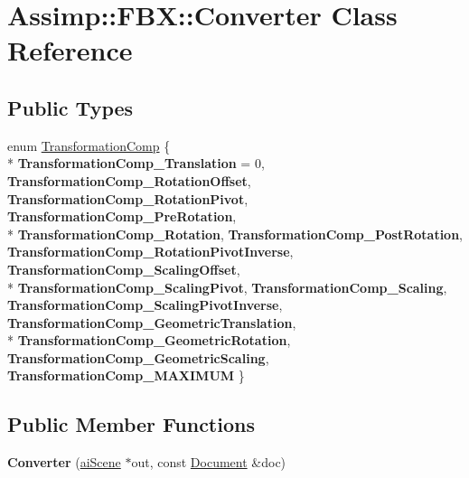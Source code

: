 \hypertarget{class_assimp_1_1_f_b_x_1_1_converter}{\section{Assimp\+:\+:F\+B\+X\+:\+:Converter Class Reference}
\label{class_assimp_1_1_f_b_x_1_1_converter}
}
\subsection*{Public Types}
\begin{DoxyCompactItemize}
\item 
enum \hyperlink{class_assimp_1_1_f_b_x_1_1_converter_a82779d0cf6d795b699e12232fe9ed15e}{Transformation\+Comp} \{ \\*
{\bfseries Transformation\+Comp\+\_\+\+Translation} = 0, 
{\bfseries Transformation\+Comp\+\_\+\+Rotation\+Offset}, 
{\bfseries Transformation\+Comp\+\_\+\+Rotation\+Pivot}, 
{\bfseries Transformation\+Comp\+\_\+\+Pre\+Rotation}, 
\\*
{\bfseries Transformation\+Comp\+\_\+\+Rotation}, 
{\bfseries Transformation\+Comp\+\_\+\+Post\+Rotation}, 
{\bfseries Transformation\+Comp\+\_\+\+Rotation\+Pivot\+Inverse}, 
{\bfseries Transformation\+Comp\+\_\+\+Scaling\+Offset}, 
\\*
{\bfseries Transformation\+Comp\+\_\+\+Scaling\+Pivot}, 
{\bfseries Transformation\+Comp\+\_\+\+Scaling}, 
{\bfseries Transformation\+Comp\+\_\+\+Scaling\+Pivot\+Inverse}, 
{\bfseries Transformation\+Comp\+\_\+\+Geometric\+Translation}, 
\\*
{\bfseries Transformation\+Comp\+\_\+\+Geometric\+Rotation}, 
{\bfseries Transformation\+Comp\+\_\+\+Geometric\+Scaling}, 
{\bfseries Transformation\+Comp\+\_\+\+M\+A\+X\+I\+M\+U\+M}
 \}
\end{DoxyCompactItemize}
\subsection*{Public Member Functions}
\begin{DoxyCompactItemize}
\item 
\hypertarget{class_assimp_1_1_f_b_x_1_1_converter_a6c6a5d4474c7696f843e01c47a8ed25a}{{\bfseries Converter} (\hyperlink{structai_scene}{ai\+Scene} $\ast$out, const \hyperlink{class_assimp_1_1_f_b_x_1_1_document}{Document} \&doc)}\label{class_assimp_1_1_f_b_x_1_1_converter_a6c6a5d4474c7696f843e01c47a8ed25a}

\end{DoxyCompactItemize}


